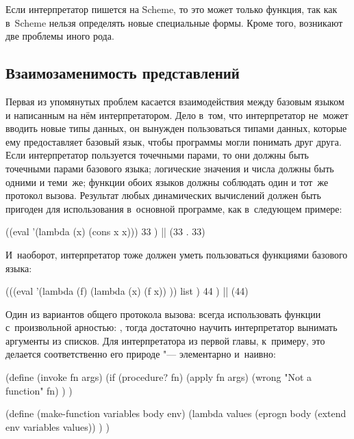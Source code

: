 Если интерпретатор пишется на Scheme, то это может только функция, так как
в~Scheme нельзя определять новые специальные формы. Кроме того, возникают две
проблемы иного рода.


\subsection{Взаимозаменимость представлений}%
\label{reflection/interpreted-eval/ssect:interchange}

Первая из упомянутых проблем касается взаимодействия между базовым языком и
написанным на нём интерпретатором. Дело в~том, что интерпретатор не~может
вводить новые типы данных, он вынужден пользоваться типами данных, которые ему
предоставляет базовый язык, чтобы программы могли понимать друг друга. Если
интерпретатор пользуется точечными парами, то они должны быть точечными парами
базового языка; логические значения и числа должны быть одними и теми~же;
функции обоих языков должны соблюдать один и тот~же протокол вызова. Результат
любых динамических вычислений должен быть пригоден для использования в~основной
программе, как в~следующем примере:

\begin{code:lisp}
((eval '(lambda (x) (cons x x)))
 33 )    |\is| (33 . 33)
\end{code:lisp}

И~наоборот, интерпретатор тоже должен уметь пользоваться функциями базового
языка:

\begin{code:lisp}
(((eval '(lambda (f)
           (lambda (x) (f x)) ))
  list )
 44 )    |\is| (44)
\end{code:lisp}

Один из вариантов общего протокола вызова: всегда использовать функции
с~произвольной арностью: , тогда достаточно научить
интерпретатор вынимать аргументы из списков. Для интерпретатора из первой главы,
к~примеру, это делается соответственно его природе "--- элементарно и~наивно:

\begin{code:lisp}
(define (invoke fn args)
  (if (procedure? fn)
      (apply fn args)
      (wrong "Not a function" fn) ) )

(define (make-function variables body env)
  (lambda values
    (eprogn body (extend env variables values)) ) )
\end{code:lisp}

